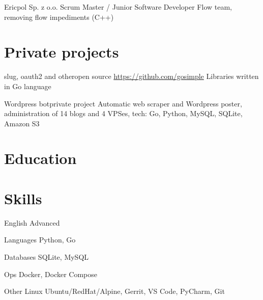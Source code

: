 \documentclass[11pt,a4paper,sans,english]{moderncv}   %
\begin{document}
	{Ericpol Sp. z o.o.}{}{}
	{Scrum Master / Junior Software Developer}
	{Flow team, removing flow impediments (C++)}


\vspace{-0.3cm}

\section{Private projects}

	{slug, oauth2 and other}{open source}{}
	{\url{https://github.com/gosimple}}
	{Libraries written in Go language}

	{Wordpress bot}{private project}{}
	{}
	{Automatic web scraper and Wordpress poster,
		administration of 14 blogs and 4 VPSes, tech: Go, Python, MySQL, SQLite, Amazon S3}


\vspace{-0.3cm}

\section{Education}

\vspace{-0.2cm}



\vspace{-0.3cm}

\section{Skills}

\cvitemwithcomment
	{English}
	{Advanced}{}

\cvitemwithcomment
	{\small{Languages}}
	{Python, Go}{}

\cvitemwithcomment
	{\small{Databases}}
	{SQLite, MySQL}{}

\cvitemwithcomment
	{\small{Ops}}
	{Docker, Docker Compose}{}

\cvitemwithcomment
	{\small{Other}}
	{\small{Linux Ubuntu/RedHat/Alpine, Gerrit, VS Code, PyCharm, Git}}{}


\vspace{0.3cm}
\end{document}
